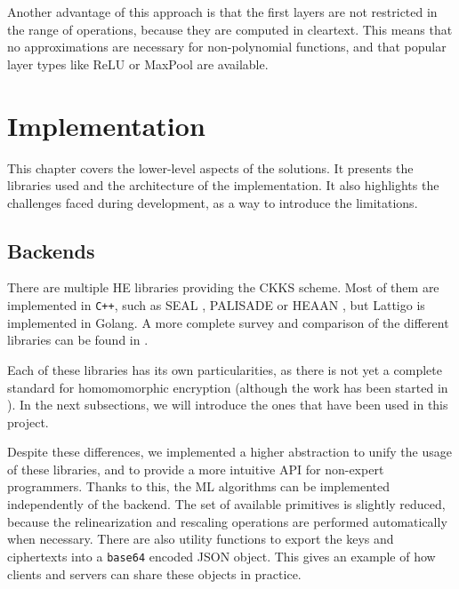 \documentclass[a4paper,11pt,oneside]{report}
\begin{document}
Another advantage of this approach is that the first layers are not restricted in the range of operations, because they are computed in cleartext. 
This means that no approximations are necessary for non-polynomial functions, and that popular layer types like ReLU or MaxPool are available.


\chapter{Implementation}



This chapter covers the lower-level aspects of the solutions. It presents the libraries used and the architecture of the implementation. It also highlights the challenges faced during development, as a way to introduce the limitations.

\section{Backends}
\label{sec:backends}

There are multiple HE libraries providing the CKKS scheme. Most of them are implemented in \texttt{C++}, such as SEAL \cite{microsoft_corporation_microsoft_2022}, PALISADE \cite{palisade_palisade_2022} or HEAAN \cite{cryptolab_inc_heaan_2022}, but Lattigo \cite{tune_insight_sa_lattigo_2022} is implemented in Golang. 
A more complete survey and comparison of the different libraries can be found in \cite{viand_sok_2021}.

Each of these libraries has its own particularities, as there is not yet a complete standard for homomomorphic encryption (although the work has been started in \cite{albrecht_homomorphic_2021}). 
In the next subsections, we will introduce the ones that have been used in this project.

Despite these differences, we implemented a higher abstraction to unify the usage of these libraries, and to provide a more intuitive API for non-expert programmers. 
Thanks to this, the ML algorithms can be implemented independently of the backend. 
The set of available primitives is slightly reduced, because the relinearization and rescaling operations are performed automatically when necessary.
There are also utility functions to export the keys and ciphertexts into a \texttt{base64} encoded JSON object.
This gives an example of how clients and servers can share these objects in practice.
\end{document}
